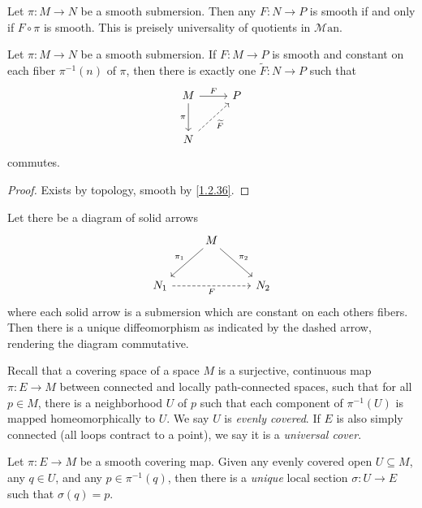 
\begin{theorem}\label{1.2.35}
	Let $\pi : M \to N$ be a smooth submersion. Then any $F : N \to P$ is smooth if and only if $F\circ \pi $ is smooth. This is preisely universality of quotients in $\mathcal{M} \mathrm{an} $.
\end{theorem}

\begin{theorem}\label{1.2.36}
	Let $\pi : M \to N$ be a smooth submersion. If $F : M \to P$ is smooth and constant on each fiber $\pi ^{-1} (n)$ of $\pi $, then there is exactly one $\widetilde{F} : N \to P$ such that
	\[\begin{tikzcd}[row sep = 2.5em, column sep = 2.5em]
	M\ar[" F ", r] \ar[" \pi  "', d]  & P \\
	N\ar[" \widetilde{F}  "', dashed, ur]  & 
	\end{tikzcd}\]
	commutes.
\end{theorem}
\begin{proof}
	Exists by topology, smooth by \cref{1.2.36}.
\end{proof}

\begin{theorem}\label{1.2.37}
	Let there be a diagram of solid arrows
	\[\begin{tikzcd}[row sep = 2.5em, column sep = 2.5em]
	 & M\ar[" \pi _2 ", dr] \ar[" \pi _1 "', dl]  &  \\
	N_1 \ar[" F "', dashed, rr] &  & N_2
	\end{tikzcd}\]
	where each solid arrow is a submersion which are constant on each others fibers. Then there is a unique diffeomorphism as indicated by the dashed arrow, rendering the diagram commutative.
\end{theorem}

\begin{definition}\label{1.2.38}
	Recall that a covering space of a space $M$ is a surjective, continuous map $\pi : E \to M$ between connected and locally path-connected spaces, such that for all $p\in M$, there is a neighborhood $U$ of $p$ such that each component of $\pi ^{-1} (U)$ is mapped homeomorphically to $U$. We say $U$ is \emph{evenly covered}. If $E$ is also simply connected (all loops contract to a point), we say it is a \emph{universal cover}.
\end{definition}

\begin{proposition}\label{1.2.39}
	Let $\pi : E \to M$ be a smooth covering map. Given any evenly covered open $U\subseteq M$, any $q\in U$, and any $p\in \pi ^{-1} (q)$, then there is a \emph{unique} local section $\sigma : U \to E$ such that $\sigma (q)=p$.
\end{proposition}

